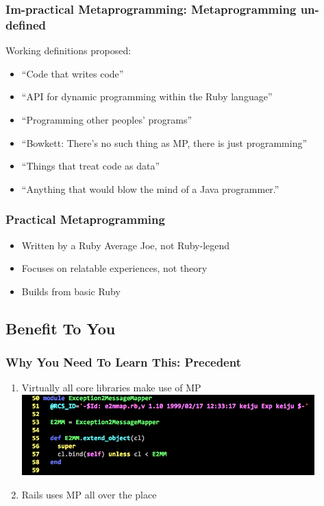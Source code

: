 \documentclass[slidestop,compress,mathserif]{beamer}
\begin{document}
\begin{frame}
	\frametitle{\textbf{Im}-practical Metaprogramming:  Metaprogramming \textbf{un}-defined}
	Working definitions proposed:
	\begin{itemize}
		\item ``Code that writes code''
		\pause
		\item ``API for dynamic programming within the Ruby language''
		\pause
		\item ``Programming other peoples' programs''
		\pause
		\item ``Bowkett:  There's no such thing as MP, there is just programming''
		\pause
		\item ``Things that treat code as data''
		\pause
		\item ``Anything that would blow the mind of a Java programmer.''
	\end{itemize}
\end{frame}

\begin{frame}
	\frametitle{Practical Metaprogramming}
	\begin{itemize}
		\pause
		\item Written by a Ruby Average Joe{\texttrademark}, not Ruby-legend
		\pause
		\item Focuses on relatable experiences, not theory
		\pause
		\item Builds from basic Ruby
	\end{itemize}
\end{frame}

\subsection{Benefit To You} %
\label{sub:benefits}

\begin{frame}
	\frametitle{Why You Need To Learn This:  Precedent}
	\begin{enumerate}
		\item Virtually all core libraries make use of MP
		\pause
		\includegraphics[scale=0.45, width=0.89\textwidth]{img/e2mmap.png}
		\pause
		\item Rails uses MP all over the place
	\end{enumerate}
\end{frame}
\end{document}

